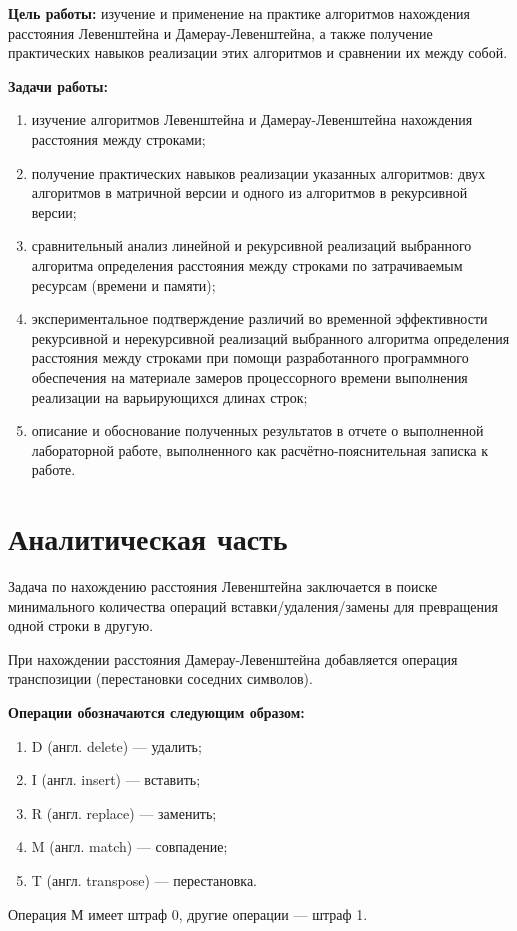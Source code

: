 \documentclass[12pt]{report}
\begin{document}
\textbf{Цель работы:} изучение и применение на практике алгоритмов нахождения расстояния Левенштейна и Дамерау-Левенштейна, а также получение практических навыков реализации этих алгоритмов и сравнении их между собой.\vspace{\baselineskip} 

\textbf{Задачи работы:}
\begin{enumerate}
  	\item изучение алгоритмов Левенштейна и Дамерау-Левенштейна нахождения расстояния между строками;
	\item получение практических навыков реализации указанных алгоритмов: двух алгоритмов в матричной версии и одного из алгоритмов в рекурсивной версии; 
	\item сравнительный анализ линейной и рекурсивной реализаций выбранного алгоритма определения расстояния между строками по затрачиваемым ресурсам (времени и памяти); 
	\item экспериментальное подтверждение различий во временной эффективности рекурсивной и
нерекурсивной реализаций выбранного алгоритма определения расстояния между строками при
помощи разработанного программного обеспечения на материале замеров процессорного времени
выполнения реализации на варьирующихся длинах строк; 
	\item описание и обоснование полученных результатов в отчете о выполненной лабораторной
работе, выполненного как расчётно-пояснительная записка к работе. 
\end{enumerate}


\chapter{Аналитическая часть}
Задача по нахождению расстояния Левенштейна заключается в поиске минимального количества операций вставки/удаления/замены для превращения одной строки в другую.\vspace{\baselineskip}

При нахождении расстояния Дамерау-Левенштейна добавляется операция транспозиции (перестановки соседних символов).\vspace{\baselineskip}  
 
\textbf{Операции обозначаются следующим образом:} 
\begin{enumerate}
  	\item D (англ. delete) — удалить;
	\item I (англ. insert) — вставить;
	\item R (англ. replace) — заменить;
	\item M (англ. match) — совпадение;
	\item T (англ. transpose) — перестановка.
\end{enumerate}
Операция М имеет штраф 0, другие операции — штраф 1.
\end{document}
